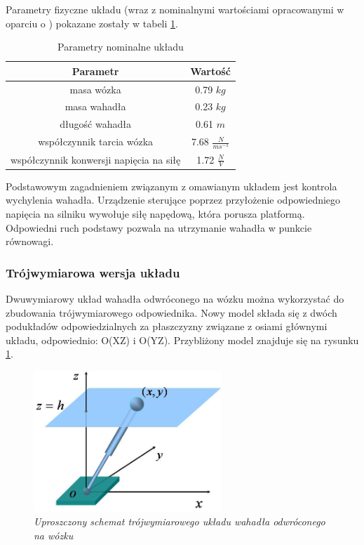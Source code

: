 \documentclass[12pt, oneside]{report}
\theoremstyle{definition}
\begin{document}
Parametry fizyczne układu (wraz z nominalnymi wartościami opracowanymi w oparciu o \cite{LMIP}) pokazane zostały w tabeli \ref{table:NominalParameters}.
\begin{table}[H]
\begin{center}
\begin{tabular}{|c|c|}
  \hline 
  Parametr & Wartość\\
  \hline
  masa wózka & 0.79 \(kg\) \\
  \hline
  masa wahadła & 0.23 \(kg\) \\
  \hline
  długość wahadła & 0.61 \(m\) \\
  \hline
  współczynnik tarcia wózka & 7.68 \(\frac{N}{ms^{-1}}\) \\
  \hline
  współczynnik konwersji napięcia na siłę & 1.72 \(\frac{N}{V}\) \\
  \hline
\end{tabular} 
\end{center}
\caption{Parametry nominalne układu}
\label{table:NominalParameters}
\end{table}

Podstawowym zagadnieniem związanym z omawianym układem jest kontrola wychylenia wahadła. Urządzenie sterujące poprzez przyłożenie odpowiedniego napięcia na silniku wywołuje siłę napędową, która porusza platformą. Odpowiedni ruch podstawy pozwala na utrzymanie wahadła w punkcie równowagi.

\subsubsection{Trójwymiarowa wersja układu}
Dwuwymiarowy układ wahadła odwróconego na wózku można wykorzystać do zbudowania trójwymiarowego odpowiednika. Nowy model składa się z dwóch podukładów odpowiedzialnych za płaszczyzny związane z osiami głównymi układu, odpowiednio: O(XZ) i O(YZ). Przybliżony model znajduje się na rysunku \ref{3DimModel}.

\begin{figure}[H]
	\centering
		\includegraphics[width = 200pt]{3DimModel} 
		\caption{\textit{Uproszczony schemat trójwymiarowego układu wahadła odwróconego na wózku \cite{3DimModel}}}
		\label{3DimModel}
\end{figure}
\end{document}

